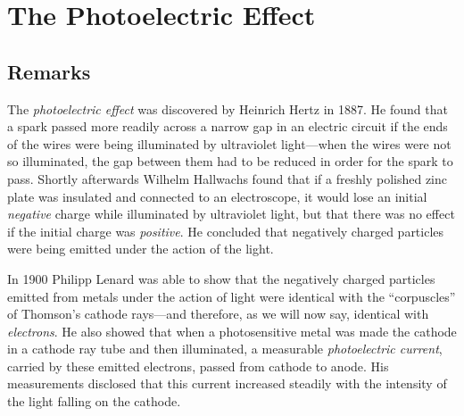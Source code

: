 \chapter{The Photoelectric Effect}\label{ch:einstein}


\renewcommand{\theequation}{\arabic{equation}}

\section*{Remarks}

The \emph{photoelectric effect} was discovered by Heinrich Hertz in
1887. He found that a spark passed more readily across a narrow gap in
an electric circuit if the ends of the wires were being illuminated by
ultraviolet light---when the wires were not so illuminated, the gap
between them had to be reduced in order for the spark to pass. Shortly
afterwards Wilhelm Hallwachs found that if a freshly polished zinc plate
was insulated and connected to an electroscope, it would lose an initial
\emph{negative} charge while illuminated by ultraviolet light, but that
there was no effect if the initial charge was \emph{positive}. He
concluded that negatively charged particles were being emitted under the
action of the light.

In 1900 Philipp Lenard was able to show that the negatively charged
particles emitted from metals under the action of light were identical
with the ``corpuscles'' of Thomson's cathode rays---and therefore, as we
will now say, identical with \emph{electrons}. He also showed that when
a photosensitive metal was made the cathode in a cathode ray tube and
then illuminated, a measurable \emph{photoelectric current}, carried by
these emitted electrons, passed from cathode to anode. His measurements
disclosed that this current increased steadily with the intensity of the
light falling on the cathode.

